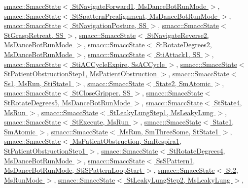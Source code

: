 \hyperlink{classsmacc_1_1SmaccState_afc39f8e0ca4001b2159a100da2fccd0e}{smacc\+::\+Smacc\+State$<$ St\+Navigate\+Forward1, Ms\+Dance\+Bot\+Run\+Mode $>$}, \hyperlink{classsmacc_1_1SmaccState_afc39f8e0ca4001b2159a100da2fccd0e}{smacc\+::\+Smacc\+State$<$ St\+Spattern\+Prealignment, Ms\+Dance\+Bot\+Run\+Mode $>$}, \hyperlink{classsmacc_1_1SmaccState_afc39f8e0ca4001b2159a100da2fccd0e}{smacc\+::\+Smacc\+State$<$ St\+Navigation\+Posture, S\+S $>$}, \hyperlink{classsmacc_1_1SmaccState_afc39f8e0ca4001b2159a100da2fccd0e}{smacc\+::\+Smacc\+State$<$ St\+Grasp\+Retreat, S\+S $>$}, \hyperlink{classsmacc_1_1SmaccState_afc39f8e0ca4001b2159a100da2fccd0e}{smacc\+::\+Smacc\+State$<$ St\+Navigate\+Reverse2, Ms\+Dance\+Bot\+Run\+Mode $>$}, \hyperlink{classsmacc_1_1SmaccState_afc39f8e0ca4001b2159a100da2fccd0e}{smacc\+::\+Smacc\+State$<$ St\+Rotate\+Degrees2, Ms\+Dance\+Bot\+Run\+Mode $>$}, \hyperlink{classsmacc_1_1SmaccState_afc39f8e0ca4001b2159a100da2fccd0e}{smacc\+::\+Smacc\+State$<$ Sti\+Attack1, S\+S $>$}, \hyperlink{classsmacc_1_1SmaccState_afc39f8e0ca4001b2159a100da2fccd0e}{smacc\+::\+Smacc\+State$<$ Sti\+A\+C\+Cycle\+Expire, Ss\+A\+C\+Cycle $>$}, \hyperlink{classsmacc_1_1SmaccState_afc39f8e0ca4001b2159a100da2fccd0e}{smacc\+::\+Smacc\+State$<$ St\+Patient\+Obstruction\+Step1, Ms\+Patient\+Obstruction $>$}, \hyperlink{classsmacc_1_1SmaccState_afc39f8e0ca4001b2159a100da2fccd0e}{smacc\+::\+Smacc\+State$<$ Ss1, Ms\+Run, Sti\+State1 $>$}, \hyperlink{classsmacc_1_1SmaccState_afc39f8e0ca4001b2159a100da2fccd0e}{smacc\+::\+Smacc\+State$<$ State2, Sm\+Atomic $>$}, \hyperlink{classsmacc_1_1SmaccState_afc39f8e0ca4001b2159a100da2fccd0e}{smacc\+::\+Smacc\+State$<$ St\+Close\+Gripper, S\+S $>$}, \hyperlink{classsmacc_1_1SmaccState_afc39f8e0ca4001b2159a100da2fccd0e}{smacc\+::\+Smacc\+State$<$ St\+Rotate\+Degrees5, Ms\+Dance\+Bot\+Run\+Mode $>$}, \hyperlink{classsmacc_1_1SmaccState_afc39f8e0ca4001b2159a100da2fccd0e}{smacc\+::\+Smacc\+State$<$ St\+State4, Ms\+Run $>$}, \hyperlink{classsmacc_1_1SmaccState_afc39f8e0ca4001b2159a100da2fccd0e}{smacc\+::\+Smacc\+State$<$ St\+Leaky\+Lung\+Step1, Ms\+Leaky\+Lung $>$}, \hyperlink{classsmacc_1_1SmaccState_afc39f8e0ca4001b2159a100da2fccd0e}{smacc\+::\+Smacc\+State$<$ St\+Execute, Ms\+Run $>$}, \hyperlink{classsmacc_1_1SmaccState_afc39f8e0ca4001b2159a100da2fccd0e}{smacc\+::\+Smacc\+State$<$ State1, Sm\+Atomic $>$}, \hyperlink{classsmacc_1_1SmaccState_afc39f8e0ca4001b2159a100da2fccd0e}{smacc\+::\+Smacc\+State$<$ Ms\+Run, Sm\+Three\+Some, St\+State1 $>$}, \hyperlink{classsmacc_1_1SmaccState_afc39f8e0ca4001b2159a100da2fccd0e}{smacc\+::\+Smacc\+State$<$ Ms\+Patient\+Obstruction, Sm\+Respira1, St\+Patient\+Obstruction\+Step1 $>$}, \hyperlink{classsmacc_1_1SmaccState_afc39f8e0ca4001b2159a100da2fccd0e}{smacc\+::\+Smacc\+State$<$ St\+Rotate\+Degrees4, Ms\+Dance\+Bot\+Run\+Mode $>$}, \hyperlink{classsmacc_1_1SmaccState_afc39f8e0ca4001b2159a100da2fccd0e}{smacc\+::\+Smacc\+State$<$ Ss\+S\+Pattern1, Ms\+Dance\+Bot\+Run\+Mode, Sti\+S\+Pattern\+Loop\+Start $>$}, \hyperlink{classsmacc_1_1SmaccState_afc39f8e0ca4001b2159a100da2fccd0e}{smacc\+::\+Smacc\+State$<$ St2, Ms\+Run\+Mode $>$}, \hyperlink{classsmacc_1_1SmaccState_afc39f8e0ca4001b2159a100da2fccd0e}{smacc\+::\+Smacc\+State$<$ St\+Leaky\+Lung\+Step2, Ms\+Leaky\+Lung $>$}, 